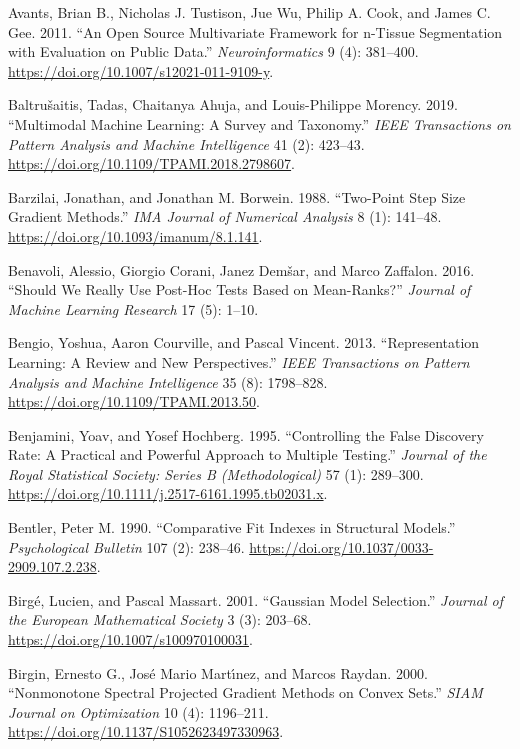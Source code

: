 \documentclass[
  10pt,
  letterpaper,
]{report}
\newlength{\cslhangindent}
\newenvironment{CSLReferences}[2] %
 {\begin{list}{}{%
  \setlength{\itemindent}{0pt}
  \setlength{\leftmargin}{0pt}
  \setlength{\parsep}{0pt}
  \ifodd #1
   \setlength{\leftmargin}{\cslhangindent}
   \setlength{\itemindent}{-1\cslhangindent}
  \fi
  \setlength{\itemsep}{#2\baselineskip}}}
 {\end{list}}
\begin{document}
\begin{CSLReferences}{1}{1}
Avants, Brian B., Nicholas J. Tustison, Jue Wu, Philip A. Cook, and
James C. Gee. 2011. {``An Open Source Multivariate Framework for
n-Tissue Segmentation with Evaluation on Public Data.''}
\emph{Neuroinformatics} 9 (4): 381--400.
\url{https://doi.org/10.1007/s12021-011-9109-y}.

Baltrušaitis, Tadas, Chaitanya Ahuja, and Louis-Philippe Morency. 2019.
{``Multimodal Machine Learning: A Survey and Taxonomy.''} \emph{IEEE
Transactions on Pattern Analysis and Machine Intelligence} 41 (2):
423--43. \url{https://doi.org/10.1109/TPAMI.2018.2798607}.

Barzilai, Jonathan, and Jonathan M. Borwein. 1988. {``Two-Point Step
Size Gradient Methods.''} \emph{IMA Journal of Numerical Analysis} 8
(1): 141--48. \url{https://doi.org/10.1093/imanum/8.1.141}.

Benavoli, Alessio, Giorgio Corani, Janez Demšar, and Marco Zaffalon.
2016. {``Should We Really Use Post-Hoc Tests Based on Mean-Ranks?''}
\emph{Journal of Machine Learning Research} 17 (5): 1--10.

Bengio, Yoshua, Aaron Courville, and Pascal Vincent. 2013.
{``Representation Learning: A Review and New Perspectives.''} \emph{IEEE
Transactions on Pattern Analysis and Machine Intelligence} 35 (8):
1798--828. \url{https://doi.org/10.1109/TPAMI.2013.50}.

Benjamini, Yoav, and Yosef Hochberg. 1995. {``Controlling the False
Discovery Rate: A Practical and Powerful Approach to Multiple
Testing.''} \emph{Journal of the Royal Statistical Society: Series B
(Methodological)} 57 (1): 289--300.
\url{https://doi.org/10.1111/j.2517-6161.1995.tb02031.x}.

Bentler, Peter M. 1990. {``Comparative Fit Indexes in Structural
Models.''} \emph{Psychological Bulletin} 107 (2): 238--46.
\url{https://doi.org/10.1037/0033-2909.107.2.238}.

Birgé, Lucien, and Pascal Massart. 2001. {``{Gaussian} Model
Selection.''} \emph{Journal of the European Mathematical Society} 3 (3):
203--68. \url{https://doi.org/10.1007/s100970100031}.

Birgin, Ernesto G., José Mario Martı́nez, and Marcos Raydan. 2000.
{``Nonmonotone Spectral Projected Gradient Methods on Convex Sets.''}
\emph{SIAM Journal on Optimization} 10 (4): 1196--211.
\url{https://doi.org/10.1137/S1052623497330963}.


\end{CSLReferences}
\end{document}
